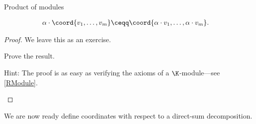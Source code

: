 \begin{prp}{Product of modules}{}
\begin{rmk}
\begin{subequations}
\begin{align}
				\alpha \cdot \coord{v_1,\ldots ,v_m} & \ceqq \coord{\alpha \cdot v_1,\ldots ,\alpha \cdot v_m}.
			\end{align}
		\end{subequations}
	\end{rmk}
	\begin{proof}
		We leave this as an exercise.
		\begin{exr}[breakable=false]{}{}
			Prove the result.
			\begin{rmk}
				Hint:  The proof is as easy as verifying the axioms of a $\K$-module---see \cref{RModule}.
			\end{rmk}
		\end{exr}
	\end{proof} 
\end{prp}

We are now ready define coordinates with respect to a direct-sum decomposition.
